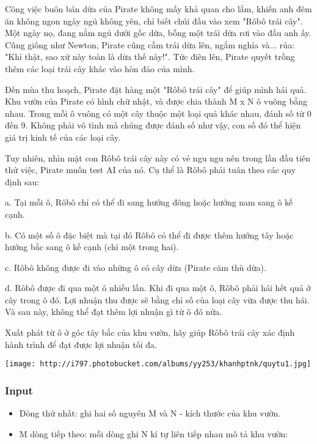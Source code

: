 



   Công việc buôn bán dừa của Pirate không mấy khả quan cho lắm, khiến anh đêm ăn không ngon ngày ngủ không yên, chỉ biết chúi đầu vào xem "Rôbô trái cây". Một ngày nọ, đang nằm ngủ dưới gốc dừa, bỗng một trái dừa rơi vào đầu anh ấy. Cũng giống như Newton, Pirate cũng cầm trái dừa lên, ngắm nghía và... rủa: "Khỉ thật, sao xứ này toàn là dừa thế này!". Tức điên lên, Pirate quyết trồng thêm các loại trái cây khác vào hòn đảo của mình.  

   Đến mùa thu hoạch, Pirate đặt hàng một "Rôbô trái cây" để giúp mình hái quả. Khu vườn của Pirate có hình chữ nhật, và được chia thành M x N ô vuông bằng nhau. Trong mỗi ô vuông có một cây thuộc một loại quả khác nhau, đánh số từ 0 đến 9. Không phải vô tình mà chúng được đánh số như vậy, con số đó thể hiện giá trị kinh tế của các loại cây.  

   Tuy nhiên, nhìn mặt con Rôbô trái cây này có vẻ ngu ngu nên trong lần đầu tiên thử việc, Pirate muốn test AI của nó. Cụ thể là Rôbô phải tuân theo các quy định sau:  

   a. Tại mỗi ô, Rôbô chỉ có thể đi sang hướng đông hoặc hướng nam sang ô kề cạnh.  

   b. Có một số ô đặc biệt mà tại đó Rôbô có thể đi được thêm hướng tây hoặc hướng bắc sang ô kề cạnh (chỉ một trong hai).  

   c. Rôbô không được đi vào những ô có cây dừa (Pirate căm thù dừa).  

   d. Rôbô được đi qua một ô nhiều lần. Khi đi qua một ô, Rôbô phải hái hết quả ở cây trong ô đó. Lợi nhuận thu được sẽ bằng chỉ số của loại cây vừa được thu hái. Và sau này, không thể đạt thêm lợi nhuận gì từ ô đó nữa.  

   Xuất phát từ ô ở góc tây bắc của khu vườn, hãy giúp Rôbô trái cây xác định hành trình để đạt được lợi nhuận tối đa.  




\texttt{[image: http://i797.photobucket.com/albums/yy253/khanhptnk/quytu1.jpg]}

\subsubsection{   Input  }
\begin{itemize}
	\item     Dòng thứ nhất: ghi hai số nguyên M và N - kích thước của khu vườn.   
	\item     M dòng tiếp theo: mỗi dòng ghi N kí tự liên tiếp nhau mô tả khu vườn:   
\end{itemize}

